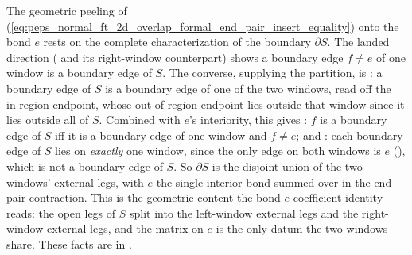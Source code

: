 \documentclass{article}
\begin{document}
The geometric peeling of
(\ref{eq:peps_normal_ft_2d_overlap_formal_end_pair_insert_equality}) onto the
bond $e$ rests on the complete
characterization of the boundary $\partial S$. The landed direction
( and its right-window
counterpart) shows a boundary edge $f\neq e$ of one window is a boundary edge of
$S$. The converse, supplying the partition, is
: a boundary edge of $S$ is a
boundary edge of one of the two windows, read off the in-region endpoint, whose
out-of-region endpoint lies outside that window since it lies outside all of $S$.
Combined with $e$'s interiority, this gives
: $f$ is a boundary edge of $S$ iff it
is a boundary edge of one window and $f\neq e$; and
: each boundary edge of
$S$ lies on \emph{exactly} one window, since the only edge on both windows is $e$
(), which is
not a boundary edge of $S$. So $\partial S$ is the disjoint union of the two
windows' external legs, with $e$ the single interior bond summed over in the
end-pair contraction. This is the geometric content the bond-$e$ coefficient
identity reads: the open legs of $S$ split into the left-window external legs and
the right-window external legs, and the matrix on $e$ is the only datum the two
windows share. These facts are in .
\end{document}
